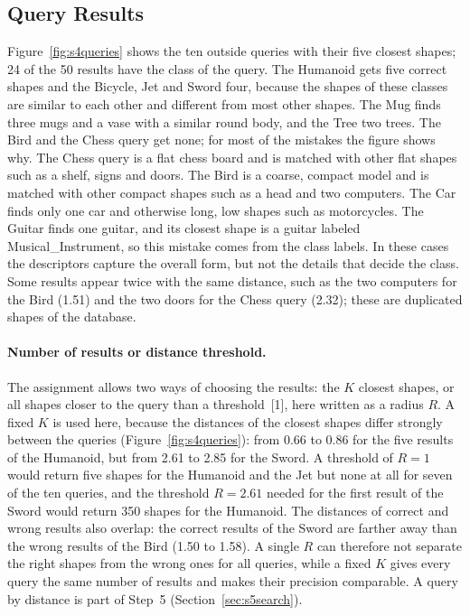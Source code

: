 \documentclass[10pt,a4paper]{article}
\begin{document}
\subsection{Query Results}\label{sec:s4results}
Figure~\ref{fig:s4queries} shows the ten outside queries with their five closest shapes; 24 of the 50 results have the class of
the query. The Humanoid gets five correct shapes and the Bicycle, Jet and Sword four, because the shapes of these classes are
similar to each other and different from most other shapes. The Mug finds three mugs and a vase with a similar round body, and
the Tree two trees. The Bird and the Chess query get none; for most of the mistakes the figure shows why. The Chess query is a
flat chess board and is matched with other flat shapes such as a shelf, signs and doors. The Bird is a coarse, compact model
and is matched with other compact shapes such as a head and two computers. The Car finds only one car and otherwise long, low
shapes such as motorcycles. The Guitar finds one guitar, and its closest shape is a guitar labeled Musical\_Instrument, so this mistake comes from
the class labels. In these cases the descriptors capture the overall form, but not the details that decide the class. Some
results appear twice with the same distance, such as the two computers for the Bird (1.51) and the two doors for the Chess
query (2.32); these are duplicated shapes of the database.

\paragraph{Number of results or distance threshold.} The assignment allows two ways of choosing the results: the $K$ closest
shapes, or all shapes closer to the query than a threshold~[1], here written as a radius $R$. A fixed $K$ is used here, because the distances of the
closest shapes differ strongly between the queries (Figure~\ref{fig:s4queries}): from 0.66 to 0.86 for the five results of the
Humanoid, but from 2.61 to 2.85 for the Sword. A threshold of $R=1$ would return five shapes for the Humanoid and the Jet but
none at all for seven of the ten queries, and the threshold $R=2.61$ needed for the first result of the Sword would return
350 shapes for the Humanoid. The distances of correct and wrong results also overlap: the correct results of the Sword are farther away than the
wrong results of the Bird (1.50 to 1.58). A single $R$ can therefore not separate the right shapes from the wrong ones for all
queries, while a fixed $K$ gives every query the same number of results and makes their precision comparable. A query by distance
is part of Step~5 (Section~\ref{sec:s5search}).
\end{document}
